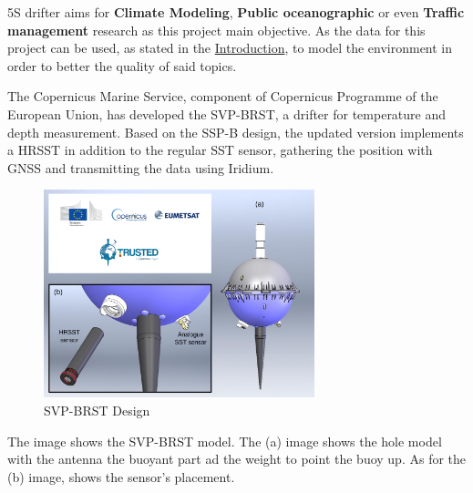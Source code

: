 5S drifter aims for \textbf{Climate Modeling}, \textbf{Public oceanographic} or even \textbf{Traffic management} research as this project main objective.
As the data for this project can be used, as stated in the \hyperref[sec:Problem Statement]{Introduction}, to model the environment
in order to better the quality of said topics.

The Copernicus Marine Service, component of Copernicus Programme of the 
European Union, has developed the SVP-BRST, a drifter for temperature and depth measurement.
Based on the SSP-B design, the updated version implements a HRSST in addition to the regular 
SST sensor, gathering the position with GNSS and transmitting the data using Iridium.
\begin{figure}[H]
    \centering
    \includegraphics[width=0.7\textwidth]{images/chapter/analysis/svp.png}  %
    \caption{SVP-BRST Design}
    \label{fig:SVP-BRST Design}        
\end{figure}
The image shows the SVP-BRST model. The (a) image shows the hole model with the antenna the buoyant part ad the weight to point the buoy up.
As for the (b) image, shows the sensor's placement. 





